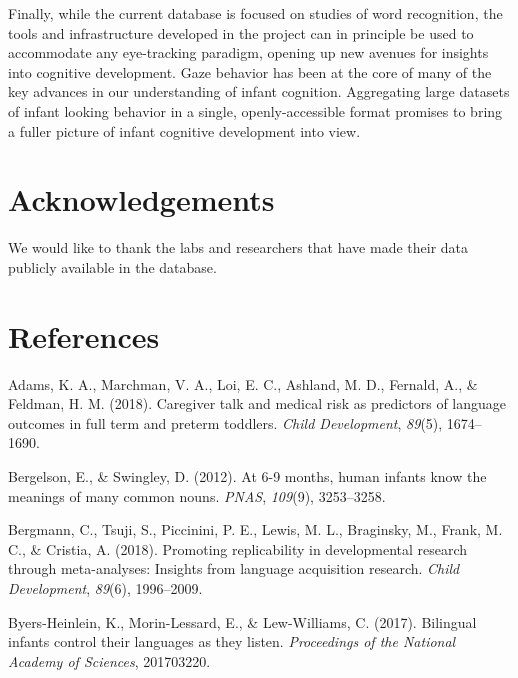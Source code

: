 \documentclass[10pt, letterpaper]{article}
\begin{document}
Finally, while the current database is focused on studies of word
recognition, the tools and infrastructure developed in the project can
in principle be used to accommodate any eye-tracking paradigm, opening
up new avenues for insights into cognitive development. Gaze behavior
has been at the core of many of the key advances in our understanding of
infant cognition. Aggregating large datasets of infant looking behavior
in a single, openly-accessible format promises to bring a fuller picture
of infant cognitive development into view.

\hypertarget{acknowledgements}{%
\section{Acknowledgements}\label{acknowledgements}}

We would like to thank the labs and researchers that have made their
data publicly available in the database.

\hypertarget{references}{%
\section{References}\label{references}}

\setlength{\parindent}{-0.1in} 
\setlength{\leftskip}{0.125in}

\noindent

\hypertarget{refs}{}
\leavevmode\hypertarget{ref-Adams2018}{}%
Adams, K. A., Marchman, V. A., Loi, E. C., Ashland, M. D., Fernald, A.,
\& Feldman, H. M. (2018). Caregiver talk and medical risk as predictors
of language outcomes in full term and preterm toddlers. \emph{Child
Development}, \emph{89}(5), 1674--1690.

\leavevmode\hypertarget{ref-Bergelson2012a}{}%
Bergelson, E., \& Swingley, D. (2012). At 6-9 months, human infants know
the meanings of many common nouns. \emph{PNAS}, \emph{109}(9),
3253--3258.

\leavevmode\hypertarget{ref-Bergmann2018}{}%
Bergmann, C., Tsuji, S., Piccinini, P. E., Lewis, M. L., Braginsky, M.,
Frank, M. C., \& Cristia, A. (2018). Promoting replicability in
developmental research through meta-analyses: Insights from language
acquisition research. \emph{Child Development}, \emph{89}(6),
1996--2009.

\leavevmode\hypertarget{ref-Byers-Heinlein2017}{}%
Byers-Heinlein, K., Morin-Lessard, E., \& Lew-Williams, C. (2017).
Bilingual infants control their languages as they listen.
\emph{Proceedings of the National Academy of Sciences}, 201703220.
\end{document}

